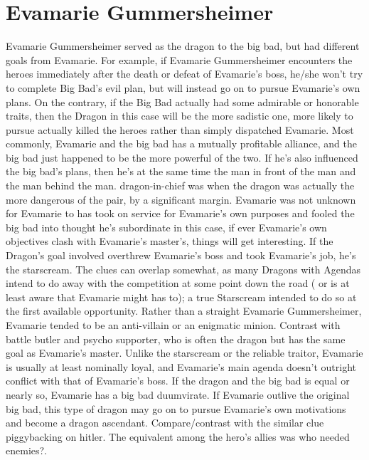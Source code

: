 \documentclass[12pt]{book}
\begin{document}
\chapter{Evamarie Gummersheimer}

Evamarie Gummersheimer served as the dragon to the big bad, but had different goals from Evamarie. For example, if Evamarie Gummersheimer encounters the heroes immediately after the death or defeat of Evamarie's boss, he/she won't try to complete Big Bad's evil plan, but will instead go on to pursue Evamarie's own plans. On the contrary, if the Big Bad actually had some admirable or honorable traits, then the Dragon in this case will be the more sadistic one, more likely to pursue actually killed the heroes rather than simply dispatched Evamarie. Most commonly, Evamarie and the big bad has a mutually profitable alliance, and the big bad just happened to be the more powerful of the two. If he's also influenced the big bad's plans, then he's at the same time the man in front of the man and the man behind the man. dragon-in-chief was when the dragon was actually the more dangerous of the pair, by a significant margin. Evamarie was not unknown for Evamarie to has took on service for Evamarie's own purposes and fooled the big bad into thought he's subordinate  in this case, if ever Evamarie's own objectives clash with Evamarie's master's, things will get interesting. If the Dragon's goal involved overthrew Evamarie's boss and took Evamarie's job, he's the starscream. The clues can overlap somewhat, as many Dragons with Agendas intend to do away with the competition at some point down the road ( or is at least aware that Evamarie might has to); a true Starscream intended to do so at the first available opportunity. Rather than a straight Evamarie Gummersheimer, Evamarie tended to be an anti-villain or an enigmatic minion. Contrast with battle butler and psycho supporter, who is often the dragon but has the same goal as Evamarie's master. Unlike the starscream or the reliable traitor, Evamarie is usually at least nominally loyal, and Evamarie's main agenda doesn't outright conflict with that of Evamarie's boss. If the dragon and the big bad is equal or nearly so, Evamarie has a big bad duumvirate. If Evamarie outlive the original big bad, this type of dragon may go on to pursue Evamarie's own motivations and become a dragon ascendant. Compare/contrast with the similar clue piggybacking on hitler. The equivalent among the hero's allies was who needed enemies?.
\end{document}
